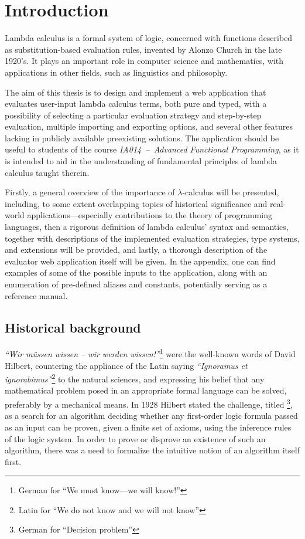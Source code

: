 \documentclass[table, a4paper, 10pt]{article}
\newcommand{\cit}[1]{\textsuperscript{\cite{#1}}}
\newcommand{\footnoteafterquote}[1]{\hspace{0.05cm}\footnote{#1}}
\begin{document}
\section{Introduction}
Lambda calculus is a formal system of logic, concerned with functions described as
substitution-based evaluation rules, invented by Alonzo Church in the late 1920's. It plays an important role in computer science
and mathematics, with applications in other fields, such as linguistics 
and philosophy.\cit{cardoneHindley}

The aim of this thesis is to design and implement a web application that evaluates
user-input lambda calculus terms, both pure and typed, with a possibility of
selecting a particular evaluation strategy and step-by-step evaluation, 
multiple importing and exporting options, and several other features lacking 
in publicly available preexisting solutions. The application should be useful to students of
the course \textit{IA014~--~Advanced Functional Programming}, as it is intended to aid in the understanding
of fundamental principles of lambda calculus taught therein.

Firstly, a general overview of the importance of $\lambda$-calculus will be presented,
including, to some extent overlapping topics of historical significance 
and real-world applications---especially contributions to the theory of
programming languages, then a rigorous definition of lambda calculus' syntax and semantics, together with
descriptions of the implemented evaluation strategies, type systems, and extensions will be provided,
and lastly, a thorough description of the evaluator web application itself will be given. In the appendix,
one can find examples of some of the possible inputs to the application, along with
an enumeration of pre-defined aliases and constants, potentially serving as a reference manual.

\subsection{Historical background}
\textit{``Wir müssen wissen -- wir werden wissen!''}\footnoteafterquote{German for ``We must know---we will know!''}
were the well-known words of David Hilbert,
countering the appliance of the Latin saying
\textit{``Ignoramus et ignorabimus''}\footnoteafterquote{Latin for ``We do not know and we will not know''}
to the natural sciences, and expressing his belief that any mathematical
problem posed in an appropriate formal language
can be solved, preferably by a mechanical means. 
In 1928 Hilbert stated the challenge,
titled \textit{}\footnote{German for ``Decision problem''},
as a search for an algorithm deciding whether any
first-order logic formula passed as an input
can be proven, given a finite set of axioms, using the inference rules of the logic system.\cit{hilbert}
In order to prove or disprove an existence of
such an algorithm, there was a need to
formalize the intuitive notion of an algorithm itself first.
\end{document}
